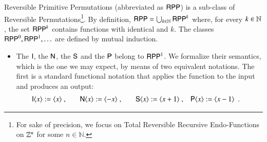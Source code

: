 \begin{definition}
\label{RevPrimPermutations}
Reversible Primitive Permutations (abbreviated as $ \mathsf{RPP} $) is a sub-class
of Reversible Permutations\footnote{For sake of precision,
we focus on Total Reversible Recursive 
Endo-Functions on $\mathbb{Z}^n$ for some $n\in\mathbb N$.}. 
By definition,  $ \mathsf{RPP}  = \bigcup_{k\in\mathbb{N}} \mathsf{RPP}^{k}$  where, for every $k\in\mathbb{N}$, the set
$ \mathsf{RPP}^{k}$ contains functions with identical \emph{\arityI} and \emph{\arityO} 
$ k$. The classes $ \mathsf{RPP}^{0}, \mathsf{RPP}^{1}, \ldots $ are defined by mutual induction.
\begin{itemize}
\item
The \rprIdName $ \mathsf{I} $,
the \rprNegName $  \mathsf{N}$,
the \rprSuccName $  \mathsf{S}$ and 
the \rprPredName $  \mathsf{P}$ 
belong to $ \mathsf{RPP}^{1}$. We formalize their semantics, which is the one we may expect,
by means of two equivalent notations. 
The first is a standard functional notation that applies the function to the input and
produces an output:
\begin{align*}
\mathsf{I}   \langle x\rangle & := \langle     x \rangle \;,&&& \mathsf{N}  \langle x\rangle & := \langle    -x \rangle\;,
&&& \mathsf{S} \langle x\rangle & := \langle x + 1 \rangle \;,& \mathsf{P} \langle x\rangle & := \langle x - 1 \rangle
\enspace .
\end{align*}


\end{itemize}
\end{definition}
